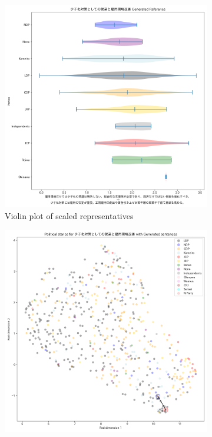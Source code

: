 \documentclass[final,5p,times,twocolumn,authoryear]{elsarticle}
\begin{document}
\begin{figure}[h]
\centering
    \begin{subfigure}{0.22\textwidth}
      \centering
      \includegraphics[width=1\linewidth]{figs/results/aging/少子化対策としての就業と雇用環境改善_gen_violin_plot.png}
      \caption{Violin plot of scaled representatives}
    \end{subfigure}
    \begin{subfigure}{0.22\textwidth}
      \centering
      \includegraphics[width=1\linewidth]{figs/results/aging/少子化対策としての就業と雇用環境改善_umap_gen.png}

\end{subfigure}
\end{figure}
\end{document}
